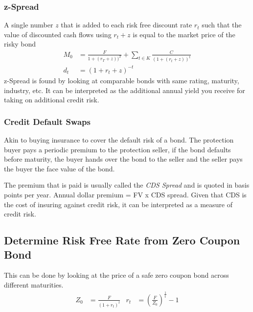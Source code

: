 \documentclass[a4paper]{article}
\begin{document}
\subsubsection{z-Spread}
A single number $z$ that is added to each risk free discount rate $r_t$ such
that the value of discounted cash flows using $r_t + z$ is equal to the market
price of the risky bond
\begin{align*}
M_0 &= \frac{F}{1 + (r_T + z))^T} + \sum_{t \in K} \frac{C}{(1 + (r_t + z))^t} \\
d_t &= (1 + r_t + z)^{-t}
\end{align*}
z-Spread is found by looking at comparable bonds with same rating, maturity,
industry, etc. It can be interpreted as the additional annual yield you
receive for taking on additional credit risk.
\subsubsection{Credit Default Swaps}
Akin to buying insurance to cover the default risk of a bond. The protection
buyer pays a periodic premium to the protection seller, if the bond defaults 
before maturity, the buyer hands over the bond to the seller and the seller
pays the buyer the face value of the bond.

The premium that is paid is usually called the \emph{CDS Spread} and is quoted
in basis points per year. Annual dollar premium = FV x CDS spread. Given that
CDS is the cost of insuring against credit risk, it can be interpreted as
a measure of credit risk.

\subsection{Determine Risk Free Rate from Zero Coupon Bond}
This can be done by looking at the price of a safe zero coupon bond across
different maturities.
\begin{align*}
Z_0 &= \frac{F}{(1 + r_t)^t} & r_t &= \left ( \frac{F}{Z_0} \right )^{\frac{1}{t}} - 1
\end{align*}
\end{document}
